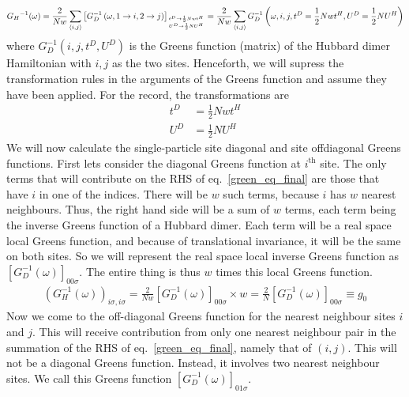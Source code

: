 \documentclass[12pt]{article}
\numberwithin{equation}{section}
\begin{document}
\begin{equation}\begin{aligned}
	\label{green_eq_final}
{G_H}^{-1}(\omega) = \frac{2}{Nw}\sum_{\left<i,j\right>}\left[G_D^{-1}\left(\omega, 1 \to i, 2 \to j\right)\right]_{t^D \to \frac{1}{2}Nwt^H \atop{U^D \to \frac{1}{2}N U^H}} = \frac{2}{Nw}\sum_{\left<i,j\right>}G_D^{-1}\left(\omega, i, j, t^D = \frac{1}{2}Nwt^H, U^D = \frac{1}{2}N U^H\right)
\end{aligned}\end{equation}
where $G_D^{-1}(i,j,t^D,U^D)$ is the Greens function (matrix) of the Hubbard dimer Hamiltonian with $i, j$ as the two sites. Henceforth, we will supress the transformation rules in the arguments of the Greens function and assume they have been applied. For the record, the transformations are
\begin{equation}\begin{aligned}
	t^D &= \frac{1}{2}Nwt^H\\
	U^D &= \frac{1}{2}N U^H
\end{aligned}\end{equation}
We will now calculate the single-particle site diagonal and site offdiagonal Greens functions. First lets consider the diagonal Greens function at $i^\text{th}$ site. The only terms that will contribute on the RHS of eq.~\ref{green_eq_final} are those that have $i$ in one of the indices. There will be $w$ such terms, because $i$ has $w$ nearest neighbours. Thus, the right hand side will be a sum of $w$ terms, each term being the inverse Greens function of a Hubbard dimer. Each term will be a real space local Greens function, and because of translational invariance, it will be the same on both sites. So we will represent the real space local inverse Greens function as $\left[G_D^{-1}(\omega)\right]_{00\sigma}$. The entire thing is thus $w$ times this local Greens function.
\begin{equation}\begin{aligned}
	\label{local_gf}
	\left(G_{H}^{-1}(\omega)\right)_{i\sigma,i\sigma} = \frac{2}{Nw}\left[G_{D}^{-1}(\omega)\right]_{00\sigma}\times w = \frac{2}{N}\left[G_{D}^{-1}(\omega)\right]_{00\sigma} \equiv g_0
\end{aligned}\end{equation}
Now we come to the off-diagonal Greens function for the nearest neighbour sites $i$ and $j$. This will receive contribution from only one nearest neighbour pair in the summation of the RHS of eq.~\ref{green_eq_final}, namely that of $\left(i,j\right)$. This will not be a diagonal Greens function. Instead, it involves two nearest neighbour sites. We call this Greens function $\left[G_D^{-1}(\omega)\right]_{01\sigma}$.
\end{document}
